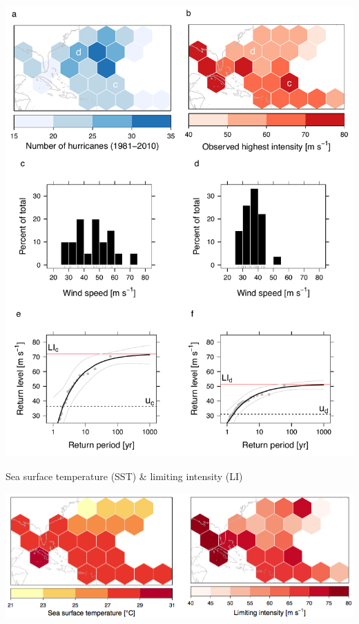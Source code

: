 \documentclass[handout]{beamer}
\begin{document}
\begin{frame}
\begin{center}
\includegraphics[scale=.3]{figures/LimitingIntensity.pdf}
\end{center}
\end{frame}

\begin{frame}{Sea surface temperature (SST) \& limiting intensity (LI)}
\begin{center}
\includegraphics[scale=.32]{figures/SSTvsLI.pdf}
\end{center}
\end{frame}
\end{document}
